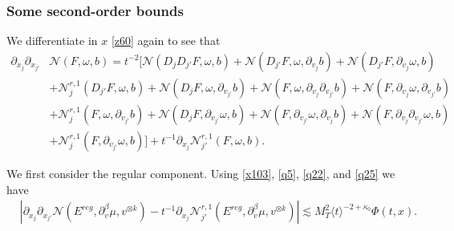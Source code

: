 \documentclass[reqno,11pt]{amsart}
\numberwithin{equation}{section}
\begin{document}
\subsubsection{Some second-order bounds} We differentiate in $x$ \eqref{z60} again to see that
\begin{equation}\label{sec5eq30}
\begin{split}
\partial_{x_j}\partial_{x_{j'}}&\mathcal N(F,\omega,b)
=t^{-2}\Big[\mathcal N(D_jD_{j'}F,\omega,b)
+\mathcal N(D_{j'}F,\omega,\partial_{v_j}b)+\mathcal N(D_{j'}F,\partial_{v_j}\omega,b)\\
&+\mathcal N_j^{r,1}(D_{j'}F,\omega,b)
+\mathcal N(D_jF,\omega,\partial_{v_{j'}}b)
+\mathcal N(F,\omega,\partial_{v_j}\partial_{v_{j'}}b)+\mathcal N(F,\partial_{v_j}\omega,\partial_{v_{j'}}b)\\
&+\mathcal N_j^{r,1}(F,\omega,\partial_{v_{j'}}b)
+\mathcal N(D_jF,\partial_{v_{j'}}\omega,b)+\mathcal N(F,\partial_{v_{j'}}\omega,\partial_{v_j}b)
+\mathcal N(F,\partial_{v_j}\partial_{v_{j'}}\omega,b)\\
&+\mathcal N_j^{r,1}(F,\partial_{v_{j'}}\omega,b)
\Big]+t^{-1}\partial_{x_j}\mathcal N_{j'}^{r,1}(F,\omega,b).
\end{split}
\end{equation}

We first consider the regular component. Using \eqref{x103}, \eqref{q5},
\eqref{q22}, and \eqref{q25} we have 
\begin{align}
&\left|
\partial_{x_j}\partial_{x_{j'}}
\mathcal N(E^{reg},\partial_v^\beta\mu,v^{\otimes k})
-t^{-1}\partial_{x_j}
\mathcal N_{j'}^{r,1}(E^{reg},\partial_v^\beta\mu,v^{\otimes k})
\right|\lesssim
M_T^2\langle t\rangle^{-2+\kappa_0}\Phi(t,x).
\label{q38}
\end{align}
\end{document}
